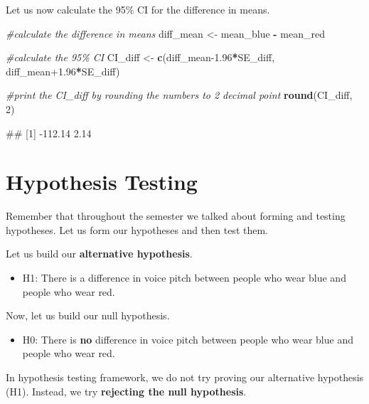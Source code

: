 \documentclass[
]{book}
\newenvironment{Shaded}{\begin{snugshade}}{\end{snugshade}}
\newcommand{\CommentTok}[1]{\textcolor[rgb]{0.56,0.35,0.01}{\textit{#1}}}
\newcommand{\DecValTok}[1]{\textcolor[rgb]{0.00,0.00,0.81}{#1}}
\newcommand{\FloatTok}[1]{\textcolor[rgb]{0.00,0.00,0.81}{#1}}
\newcommand{\FunctionTok}[1]{\textcolor[rgb]{0.13,0.29,0.53}{\textbf{#1}}}
\newcommand{\NormalTok}[1]{#1}
\newcommand{\OtherTok}[1]{\textcolor[rgb]{0.56,0.35,0.01}{#1}}
\newcommand{\SpecialCharTok}[1]{\textcolor[rgb]{0.81,0.36,0.00}{\textbf{#1}}}
\providecommand{\tightlist}{%
  \setlength{\itemsep}{0pt}\setlength{\parskip}{0pt}}
\begin{document}
Let us now calculate the 95\% CI for the difference in means.

\begin{Shaded}
\begin{Highlighting}[]
\CommentTok{\#calculate the difference in means}
\NormalTok{diff\_mean }\OtherTok{\textless{}{-}}\NormalTok{ mean\_blue }\SpecialCharTok{{-}}\NormalTok{ mean\_red}

\CommentTok{\#calculate the 95\% CI}
\NormalTok{CI\_diff }\OtherTok{\textless{}{-}} \FunctionTok{c}\NormalTok{(diff\_mean}\FloatTok{{-}1.96}\SpecialCharTok{*}\NormalTok{SE\_diff, diff\_mean}\FloatTok{+1.96}\SpecialCharTok{*}\NormalTok{SE\_diff)}

\CommentTok{\#print the CI\_diff by rounding the numbers to 2 decimal point}
\FunctionTok{round}\NormalTok{(CI\_diff, }\DecValTok{2}\NormalTok{)}
\end{Highlighting}
\end{Shaded}

\begin{Shaded}
\begin{Highlighting}[]
\NormalTok{\#\# [1] {-}112.14    2.14}
\end{Highlighting}
\end{Shaded}

\section{Hypothesis Testing}\label{hypothesis-testing}

Remember that throughout the semester we talked about forming and testing hypotheses. Let us form our hypotheses and then test them.

Let us build our \textbf{alternative hypothesis}.

\begin{itemize}
\tightlist
\item
  H1: There is a difference in voice pitch between people who wear blue and people who wear red.
\end{itemize}

Now, let us build our null hypothesis.

\begin{itemize}
\tightlist
\item
  H0: There is \textbf{no} difference in voice pitch between people who wear blue and people who wear red.
\end{itemize}

In hypothesis testing framework, we do not try proving our alternative hypothesis (H1). Instead, we try \textbf{rejecting the null hypothesis}.
\end{document}
